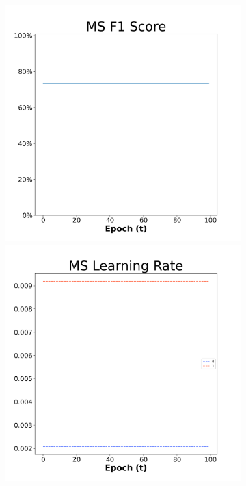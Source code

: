 \begin{figure}[H]
    \centering %
\begin{subfigure}{0.3\textwidth}
  \includegraphics[width=\linewidth]{images/exper2/SP/MS_0.01_f1.png}
    \includegraphics[width=\linewidth]{images/exper2/SP/MS_0.01_lr.png}

\end{subfigure}
\end{figure}
